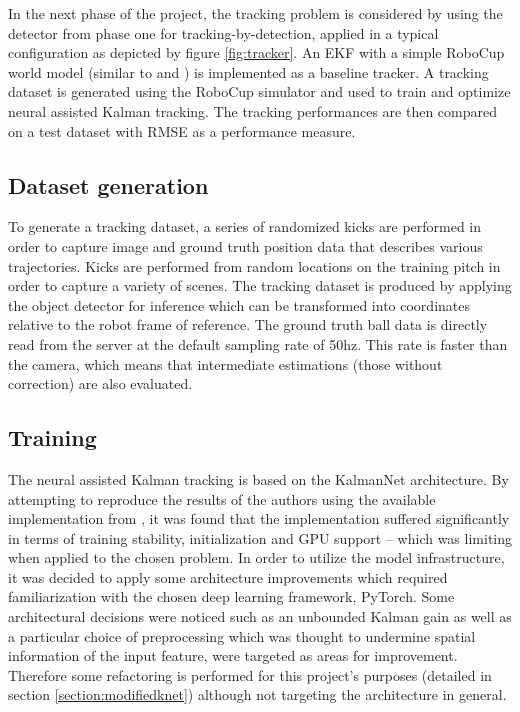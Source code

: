 \documentclass[a4paper,twoside,12pt]{report}
\begin{document}
In the next phase of the project, the tracking problem is considered by using the detector from phase one for tracking-by-detection, applied in a typical configuration as depicted by figure \ref{fig:tracker}. An EKF with a simple RoboCup world model (similar to \cite{kalmanmodel} and  \cite{3dparabola}) is implemented as a baseline tracker. A tracking dataset is generated using the RoboCup simulator and used to train and optimize neural assisted Kalman tracking. The tracking performances are then compared on a test dataset with RMSE as a performance measure.

\subsection{Dataset generation}

To generate a tracking dataset, a series of randomized kicks are performed in order to capture image and ground truth position data that describes various trajectories. Kicks are performed from random locations on the training pitch in order to capture a variety of scenes. The tracking dataset is produced by applying the object detector for inference which can be transformed into coordinates relative to the robot frame of reference. The ground truth ball data is directly read from the server at the default sampling rate of 50hz. This rate is faster than the camera, which means that intermediate estimations (those without correction) are also evaluated.

\subsection{Training}
The neural assisted Kalman tracking is based on the KalmanNet architecture. By attempting to reproduce the results of the authors using the available implementation from \cite{kalmangit}, it was found that the implementation suffered significantly in terms of training stability, initialization and GPU support -- which was limiting when applied to the chosen problem. In order to utilize the model infrastructure, it was decided to apply some architecture improvements which required familiarization with the chosen deep learning framework, PyTorch. Some architectural decisions were noticed such as an unbounded Kalman gain as well as a particular choice of preprocessing which was thought to undermine spatial information of the input feature, were targeted as areas for improvement. Therefore some refactoring is performed for this project's purposes (detailed in section \ref{section:modifiedknet}) although not targeting the architecture in general.
\end{document}
